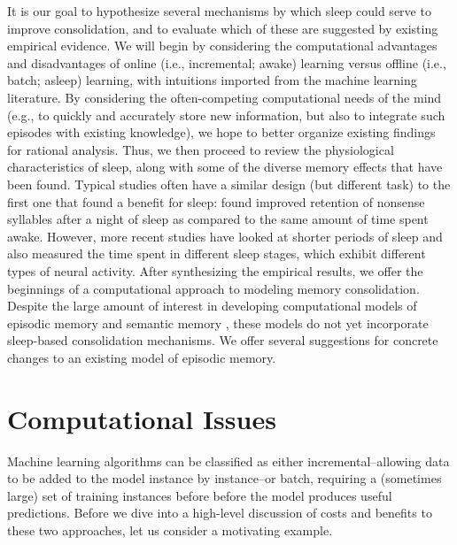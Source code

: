 \documentclass[10pt,letterpaper]{article}
\begin{document}
It is our goal to hypothesize several mechanisms by which sleep could serve to improve consolidation, and to evaluate which of these are suggested by existing empirical evidence. We will begin by considering the computational advantages and disadvantages of online (i.e., incremental; awake) learning versus offline (i.e., batch; asleep) learning, with intuitions imported from the machine learning literature. By considering the often-competing computational needs of the mind (e.g., to quickly and accurately store new information, but also to integrate such episodes with existing knowledge), we hope to better organize existing findings for rational analysis. Thus, we then proceed to review the physiological characteristics of sleep, along with some of the diverse memory effects that have been found. Typical studies often have a similar design (but different task) to the first one that found a benefit for sleep:  found improved retention of nonsense syllables after a night of sleep as compared to the same amount of time spent awake. However, more recent studies have looked at shorter periods of sleep and also measured the time spent in different sleep stages, which exhibit different types of neural activity. After synthesizing the empirical results, we offer the beginnings of a computational approach to modeling memory consolidation. Despite the large amount of interest in developing computational models of episodic memory \cite[e.g.]{Hintzman:1984,Shiffrin:1997} and semantic memory \cite[e.g.]{Jones:2007}, these models do not yet incorporate sleep-based consolidation mechanisms. We offer several suggestions for concrete changes to an existing model of episodic memory.
\vspace{-.1cm}
\section{Computational Issues}
\vspace{-.1cm}
Machine learning algorithms can be classified as either incremental--allowing data to be added to the model instance by instance--or batch, requiring a (sometimes large) set of training instances before before the model produces useful predictions. Before we dive into a high-level discussion of costs and benefits to these two approaches, let us consider a motivating example. 
\vspace{-.1cm}
\end{document}
